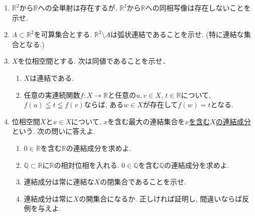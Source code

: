 \documentclass[dvipdfmx,a4paper,11pt]{article}
\newcommand{\R}{\mathbb{R}}
\newcommand{\Q}{\mathbb{Q}}
\theoremstyle{definition}
\begin{document}
\begin{enumerate}[label=\textbf{問}\ref*{sec-connected}.\arabic*]
\item $\R^2$から$\R$への全単射は存在するが, $\R^2$から$\R$への同相写像は存在しないことを示せ.

\item $A \subset \R^2$を可算集合とする. $\R^2 \setminus A$は弧状連結であることを示せ. (特に連結な集合となる.)


\item $X$を位相空間とする. 次は同値であることを示せ．
\begin{enumerate}[label=(\roman*)]
	\setlength{\parskip}{0cm} 
  \setlength{\itemsep}{0pt} 
  \item $X$は連結である.
  \item 任意の実連続関数$f : X \rightarrow \R$と任意の$u,v \in X$, $t \in \R$について, $f(u) \leqq t \leqq f(v)$ならば, ある$w \in X$が存在して$f(w) = t$となる. 
\end{enumerate}



\newpage
\item 位相空間$X$と$x \in X$について, $x$を含む最大の連結集合を\underline{$x$を含む$X$の連結成分}という. 次の問いに答えよ. 
\begin{enumerate}
	\setlength{\parskip}{0cm} 
  \setlength{\itemsep}{0pt} 
  \item $0 \in \R$を含む$\R$の連結成分を求めよ.
  \item $\Q \subset \R$に$\R$の相対位相を入れる. $0 \in \Q$を含む$\Q$の連結成分を求めよ. 
  \item 連結成分は常に連結な$X$の閉集合であることを示せ.
  \item 連結成分は常に$X$の開集合になるか. 正しければ証明し, 間違いならば反例を与えよ.
\end{enumerate}



\end{enumerate}
\end{document}
